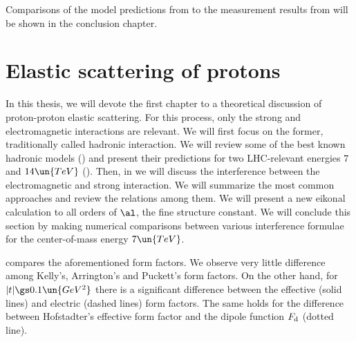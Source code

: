
Comparisons of the model predictions from  to the measurement results from  will be shown in the conclusion chapter.


\chapter[el]{Elastic scattering of protons}

In this thesis, we will devote the first chapter to a theoretical discussion of proton-proton elastic scattering. For this process, only the strong and electromagnetic interactions are relevant. We will first focus on the former, traditionally called hadronic interaction. We will review some of the best known hadronic models () and present their predictions for two LHC-relevant energies $7$ and $14\un{TeV}$ (). Then, in  we will discuss the interference between the electromagnetic and strong interaction. We will summarize the most common approaches and review the relations among them. We will present a new eikonal calculation to all orders of $\al$, the fine structure constant. We will conclude this section by making numerical comparisons between various interference formulae for the center-of-mass energy $7\un{TeV}$.



 compares the aforementioned form factors. We observe very little difference among Kelly's, Arrington's and Puckett's form factors. On the other hand, for $|t| \gs 0.1\un{GeV^2}$ there is a significant difference between the effective (solid lines) and electric (dashed lines) form factors. The same holds for the difference between Hofstadter's effective form factor and the dipole function $F_{\rm d}$ (dotted line).

